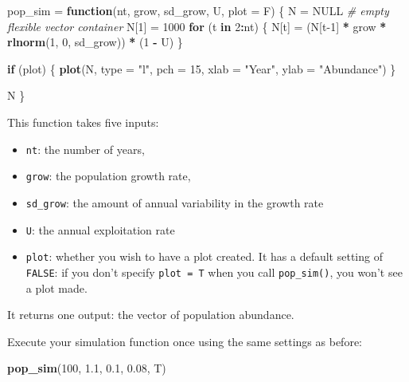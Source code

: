 \documentclass[]{book}
\newenvironment{Shaded}{\begin{snugshade}}{\end{snugshade}}
\newcommand{\CommentTok}[1]{\textcolor[rgb]{0.56,0.35,0.01}{\textit{#1}}}
\newcommand{\ControlFlowTok}[1]{\textcolor[rgb]{0.13,0.29,0.53}{\textbf{#1}}}
\newcommand{\DataTypeTok}[1]{\textcolor[rgb]{0.13,0.29,0.53}{#1}}
\newcommand{\DecValTok}[1]{\textcolor[rgb]{0.00,0.00,0.81}{#1}}
\newcommand{\FloatTok}[1]{\textcolor[rgb]{0.00,0.00,0.81}{#1}}
\newcommand{\KeywordTok}[1]{\textcolor[rgb]{0.13,0.29,0.53}{\textbf{#1}}}
\newcommand{\NormalTok}[1]{#1}
\newcommand{\OperatorTok}[1]{\textcolor[rgb]{0.81,0.36,0.00}{\textbf{#1}}}
\newcommand{\OtherTok}[1]{\textcolor[rgb]{0.56,0.35,0.01}{#1}}
\newcommand{\StringTok}[1]{\textcolor[rgb]{0.31,0.60,0.02}{#1}}
\providecommand{\tightlist}{%
  \setlength{\itemsep}{0pt}\setlength{\parskip}{0pt}}
\begin{document}
\begin{Shaded}
\begin{Highlighting}[]
\NormalTok{pop_sim =}\StringTok{ }\ControlFlowTok{function}\NormalTok{(nt, grow, sd_grow, U, }\DataTypeTok{plot =}\NormalTok{ F) \{}
\NormalTok{  N =}\StringTok{ }\OtherTok{NULL} \CommentTok{# empty flexible vector container}
\NormalTok{  N[}\DecValTok{1}\NormalTok{] =}\StringTok{ }\DecValTok{1000}
  \ControlFlowTok{for}\NormalTok{ (t }\ControlFlowTok{in} \DecValTok{2}\OperatorTok{:}\NormalTok{nt) \{}
\NormalTok{    N[t] =}\StringTok{ }\NormalTok{(N[t}\DecValTok{-1}\NormalTok{] }\OperatorTok{*}\StringTok{ }\NormalTok{grow }\OperatorTok{*}\StringTok{ }\KeywordTok{rlnorm}\NormalTok{(}\DecValTok{1}\NormalTok{, }\DecValTok{0}\NormalTok{, sd_grow)) }\OperatorTok{*}\StringTok{ }\NormalTok{(}\DecValTok{1} \OperatorTok{-}\StringTok{ }\NormalTok{U)}
\NormalTok{  \}}
  
  \ControlFlowTok{if}\NormalTok{ (plot) \{}
    \KeywordTok{plot}\NormalTok{(N, }\DataTypeTok{type =} \StringTok{"l"}\NormalTok{, }\DataTypeTok{pch =} \DecValTok{15}\NormalTok{, }\DataTypeTok{xlab =} \StringTok{"Year"}\NormalTok{, }\DataTypeTok{ylab =} \StringTok{"Abundance"}\NormalTok{)}
\NormalTok{  \}}
  
\NormalTok{  N}
\NormalTok{\}}
\end{Highlighting}
\end{Shaded}

This function takes five inputs:

\begin{itemize}
\tightlist
\item
  \texttt{nt}: the number of years,
\item
  \texttt{grow}: the population growth rate,
\item
  \texttt{sd\_grow}: the amount of annual variability in the growth rate
\item
  \texttt{U}: the annual exploitation rate
\item
  \texttt{plot}: whether you wish to have a plot created. It has a default setting of \texttt{FALSE}: if you don't specify \texttt{plot\ =\ T} when you call \texttt{pop\_sim()}, you won't see a plot made.
\end{itemize}

It returns one output: the vector of population abundance.

Execute your simulation function once using the same settings as before:

\begin{Shaded}
\begin{Highlighting}[]
\KeywordTok{pop_sim}\NormalTok{(}\DecValTok{100}\NormalTok{, }\FloatTok{1.1}\NormalTok{, }\FloatTok{0.1}\NormalTok{, }\FloatTok{0.08}\NormalTok{, T)}
\end{Highlighting}
\end{Shaded}
\end{document}
